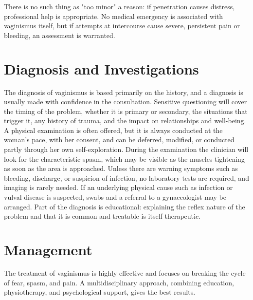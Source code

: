 There is no such thing as "too minor" a reason: if penetration causes distress, professional help is appropriate. No medical emergency is associated with vaginismus itself, but if attempts at intercourse cause severe, persistent pain or bleeding, an assessment is warranted.

\section*{Diagnosis and Investigations}
The diagnosis of vaginismus is based primarily on the history, and a diagnosis is usually made with confidence in the consultation. Sensitive questioning will cover the timing of the problem, whether it is primary or secondary, the situations that trigger it, any history of trauma, and the impact on relationships and well-being. A physical examination is often offered, but it is always conducted at the woman's pace, with her consent, and can be deferred, modified, or conducted partly through her own self-exploration. During the examination the clinician will look for the characteristic spasm, which may be visible as the muscles tightening as soon as the area is approached. Unless there are warning symptoms such as bleeding, discharge, or suspicion of infection, no laboratory tests are required, and imaging is rarely needed. If an underlying physical cause such as infection or vulval disease is suspected, swabs and a referral to a gynaecologist may be arranged. Part of the diagnosis is educational: explaining the reflex nature of the problem and that it is common and treatable is itself therapeutic.

\section*{Management}
The treatment of vaginismus is highly effective and focuses on breaking the cycle of fear, spasm, and pain. A multidisciplinary approach, combining education, physiotherapy, and psychological support, gives the best results.

